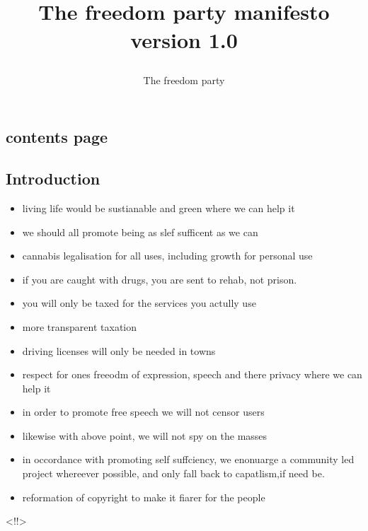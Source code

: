 \documentclass[titlepage]{article}
\author{ The freedom party \\
}
\title{
\titlehead{\centering\texttt{[image: CC-by.png]}}\\
The freedom party manifesto \\
version 1.0
}
\begin{document}
\maketitle
\begin{centering}
\section{contents page}
\end{centering}
\tableofcontents
\newpage
\begin{centering}
\section{Introduction}
\end{centering}

\begin{itemize}
	\item living life would be sustianable and green where we can help it
	\item we should all promote being as slef sufficent as we can
	\item cannabis legalisation for all uses, including growth for personal use
	\item if you are caught with drugs, you are sent to rehab, not prison.
	\item you will only be taxed for the services you actully use
	\item more transparent taxation
	\item driving licenses will only be needed in towns
	\item respect for ones freeodm of expression, speech and there privacy where we can help it
	\item in order to promote free speech we will not censor users
	\item likewise with above point, we will not spy on the masses
	\item in occordance with promoting self suffciency, we enonuarge a community led project whereever possible, and only fall back to capatlism,if need be.
	\item reformation of copyright to make it fiarer for the people
\end{itemize}
\newpage
<!!>
\end{document}
